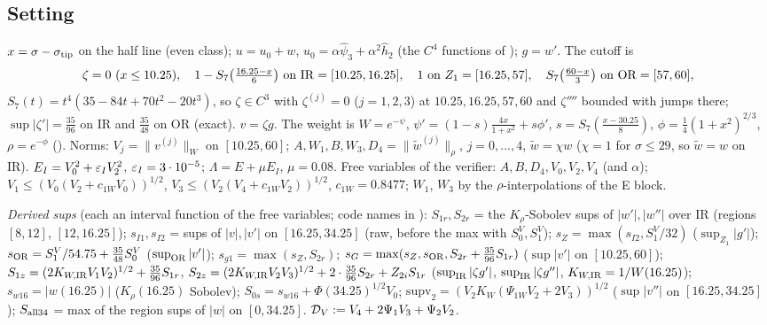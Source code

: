 \documentclass[11pt]{article}
\begin{document}
\subsection{Setting}\label{EI:sec:set}
$x=\sigma-\sigma_{\rm tip}$ on the half line (even class); $u=u_0+w$, $u_0=\alpha\hat\psi_3+\alpha^2\hat h_2$ (the $C^4$ functions of ); $g=w'$. The cutoff is
\[
\zeta=0\ (x\le10.25),\quad 1-S_7\bigl(\tfrac{16.25-x}{6}\bigr)\ \text{on }\mathrm{IR}=[10.25,16.25],\quad 1\ \text{on }Z_1=[16.25,57],\quad S_7\bigl(\tfrac{60-x}3\bigr)\ \text{on }\mathrm{OR}=[57,60],
\]
$S_7(t)=t^4(35-84t+70t^2-20t^3)$, so $\zeta\in C^3$ with $\zeta^{(j)}=0$ ($j=1,2,3$) at $10.25,16.25,57,60$ and $\zeta''''$ bounded with jumps there; $\sup|\zeta'|=\frac{35}{96}$ on IR and $\frac{35}{48}$ on OR (exact). $v=\zeta g$. The weight is $W=e^{-\psi}$, $\psi'=(1-s)\frac{4x}{1+x^2}+s\phi'$, $s=S_7(\frac{x-30.25}8)$, $\phi=\frac14(1+x^2)^{2/3}$, $\rho=e^{-\phi}$ (). Norms: $V_j=\|v^{(j)}\|_W$ on $[10.25,60]$; $A,W_1,B,W_3,D_4=\|\tilde w^{(j)}\|_\rho$, $j=0,\dots,4$, $\tilde w=\chi w$ ($\chi=1$ for $\sigma\le29$, so $\tilde w=w$ on IR). $E_I=V_0^2+\varepsilon_I V_2^2$, $\varepsilon_I=3\cdot10^{-5}$; $\Lambda=E+\mu E_I$, $\mu=0.08$. Free variables of the verifier: $A,B,D_4,V_0,V_2,V_4$ (and $\alpha$); $V_1\le(V_0(V_2+c_{1W}V_0))^{1/2}$, $V_3\le(V_2(V_4+c_{1W}V_2))^{1/2}$, $c_{1W}=0.8477$; $W_1$, $W_3$ by the $\rho$-interpolations of the E block.

\noindent\emph{Derived sups} (each an interval function of the free variables; code names in ): $S_{1r},S_{2r}$ = the $K_\rho$-Sobolev sups of $|w'|,|w''|$ over IR (regions $[8,12]$, $[12,16.25]$); $s_{I1},s_{I2}$ = sups of $|v|,|v'|$ on $[16.25,34.25]$ (raw, before the max with $S^V_0,S^V_1$); $s_Z=\max(s_{I2},S^V_1/32)$ ($\sup_{Z_1}|g'|$); $s_{\rm OR}=S^V_1/54.75+\frac{35}{48}S^V_0$ ($\sup_{\mathrm{OR}}|v'|$); $s_{g1}=\max(s_Z,S_{2r})$; $s_G=\max(s_Z,s_{\rm OR},S_{2r}+\frac{35}{96}S_{1r})$ ($\sup|v'|$ on $[10.25,60]$); $S_{1z}=(2K_{W,\rm IR}V_1V_2)^{1/2}+\frac{35}{96}S_{1r}$, $S_{2z}=(2K_{W,\rm IR}V_2V_3)^{1/2}+2\cdot\frac{35}{96}S_{2r}+Z_{2i}S_{1r}$ ($\sup_{\rm IR}|\zeta g'|$, $\sup_{\rm IR}|\zeta g''|$, $K_{W,\rm IR}=1/W(16.25)$); $s_{w16}=|w(16.25)|$ ($K_\rho(16.25)$ Sobolev); $S_{0s}=s_{w16}+\Phi(34.25)^{1/2}V_0$; $\mathrm{supv}_2=(V_2K_W(\Psi_{1W}V_2+2V_3))^{1/2}$ ($\sup|v''|$ on $[16.25,34.25]$); $S_{\rm all34}$ = max of the region sups of $|w|$ on $[0,34.25]$. $\mathcal D_V:=V_4+2\Psi_1V_3+\Psi_2V_2$.
\end{document}
